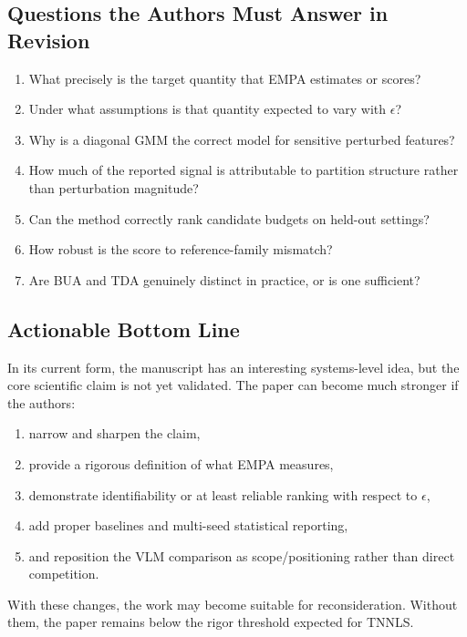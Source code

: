 \subsection*{Questions the Authors Must Answer in Revision}
\begin{enumerate}
    \item What precisely is the target quantity that EMPA estimates or scores?
    \item Under what assumptions is that quantity expected to vary with $\epsilon$?
    \item Why is a diagonal GMM the correct model for sensitive perturbed features?
    \item How much of the reported signal is attributable to partition structure rather than perturbation magnitude?
    \item Can the method correctly rank candidate budgets on held-out settings?
    \item How robust is the score to reference-family mismatch?
    \item Are BUA and TDA genuinely distinct in practice, or is one sufficient?
\end{enumerate}

\subsection*{Actionable Bottom Line}
In its current form, the manuscript has an interesting systems-level idea, but the core scientific claim is not yet validated. The paper can become much stronger if the authors:
\begin{enumerate}
    \item narrow and sharpen the claim,
    \item provide a rigorous definition of what EMPA measures,
    \item demonstrate identifiability or at least reliable ranking with respect to $\epsilon$,
    \item add proper baselines and multi-seed statistical reporting,
    \item and reposition the VLM comparison as scope/positioning rather than direct competition.
\end{enumerate}

With these changes, the work may become suitable for reconsideration. Without them, the paper remains below the rigor threshold expected for TNNLS.
